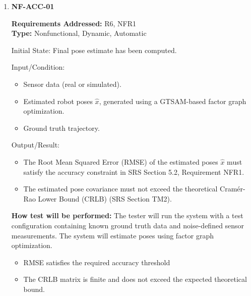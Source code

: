 \documentclass[12pt, titlepage]{article}
\begin{document}
\begin{enumerate}

\item{\textbf{NF-ACC-01}}

\textbf{Requirements Addressed:} R6, NFR1\\
\textbf{Type:} Nonfunctional, Dynamic, Automatic
					
Initial State: Final pose estimate has been computed.
					
Input/Condition: 
\begin{itemize}
  \item Sensor data (real or simulated).
  \item Estimated robot poses $\hat{x}$, generated using a GTSAM-based factor graph optimization.
  \item Ground truth trajectory.
\end{itemize}
					
Output/Result: 
\begin{itemize}
  \item The Root Mean Squared Error (RMSE) of the estimated poses $\hat{x}$ must satisfy the accuracy constraint in SRS Section 5.2, Requirement NFR1.
  \item The estimated pose covariance must not exceed the theoretical Cram\'er-Rao Lower Bound (CRLB) (SRS Section TM2).
\end{itemize}
					
\textbf{How test will be performed:} The tester will run the system with a test configuration containing known ground truth data and noise-defined sensor measurements. The system will estimate poses using factor graph optimization.
\begin{itemize}
  \item RMSE satisfies the required accuracy threshold
  \item The CRLB matrix is finite and does not exceed the expected theoretical bound.
\end{itemize}

\end{enumerate}
\end{document}
